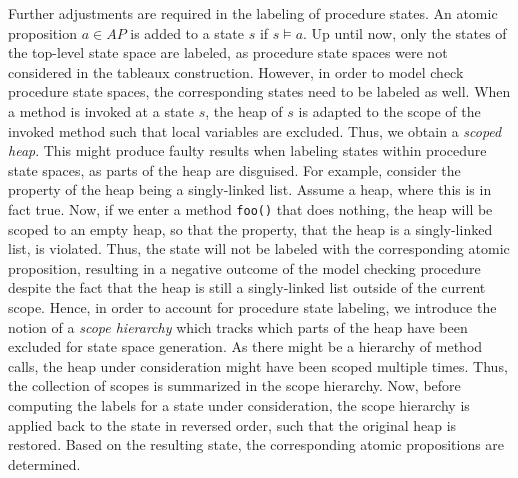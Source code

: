 \documentclass[a4paper, 12pt, twoside]{report}
\begin{document}
	Further adjustments are required in the labeling of procedure states. An atomic proposition $a \in AP$ is added to a state $s$ if $s \models a$.  Up until now, only the states of the top-level state space are labeled, as procedure state spaces were not considered in the tableaux construction. However, in order to model check procedure state spaces, the corresponding states need to be labeled as well. When a method is invoked at a state $s$, the heap of $s$ is adapted to the scope of the invoked method such that local variables are excluded. Thus, we obtain a \textit{scoped heap}. This might produce faulty results when labeling states within procedure state spaces, as parts of the heap are disguised. For example, consider the property of the heap being a singly-linked list. Assume a heap, where this is in fact true. Now, if we enter a method \texttt{foo()} that does nothing, the heap will be scoped to an empty heap, so that the property, that the heap is a singly-linked list, is violated. Thus, the state will not be labeled with the corresponding atomic proposition, resulting in a negative outcome of the model checking procedure despite the fact that the heap is still a singly-linked list outside of the current scope. Hence, in order to account for procedure state labeling, we introduce the notion of a \textit{scope hierarchy} which tracks which parts of the heap have been excluded for state space generation. As there might be a hierarchy of method calls, the heap under consideration might have been scoped multiple times. Thus, the collection of scopes is summarized in the scope hierarchy. Now, before computing the labels for a state under consideration, the scope hierarchy is applied back to the state in reversed order, such that the original heap is restored. Based on the resulting state, the corresponding atomic propositions are determined.
	
\end{document}
